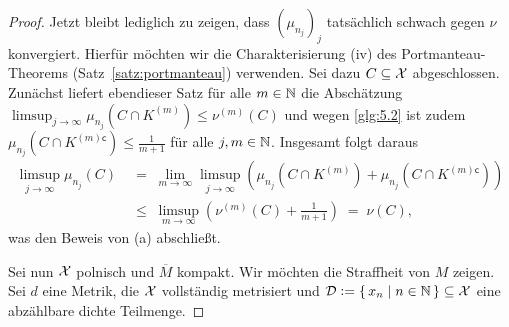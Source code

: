 \documentclass[../thesis/thesis.tex]{subfiles}
\begin{document}
\begin{proof}
		Jetzt bleibt lediglich zu zeigen, dass $(\mu_{n_j})_j$ tatsächlich schwach gegen $\nu$ konvergiert. 
		Hierfür möchten wir die Charakterisierung (iv) des Portmanteau-Theorems (Satz~\ref{satz:portmanteau}) verwenden.
		Sei dazu $C \subseteq \mathcal{X}$ abgeschlossen. Zunächst liefert ebendieser Satz für alle $m \in \mathbb{N}$ die 
		Abschätzung $\limsup_{j \to \infty} \mu_{n_j}(C \cap K^{(m)}) \leq \nu^{(m)}(C)$ und wegen \eqref{glg:5.2} ist 
		zudem $\mu_{n_j}(C \cap K^{(m) \mathsf{c}}) \leq  \frac{1}{m+1}$ für alle $j, m \in \mathbb{N}$. Insgesamt folgt daraus 
		\begin{align*}
			\limsup_{j \to \infty} \mu_{n_j}(C) \; &=    \; \lim_{m \to \infty} \limsup_{j \to \infty} 
			\left( \mu_{n_j}(C \cap K^{(m)}) + \mu_{n_j}(C \cap K^{(m) \mathsf{c}}) \right) \\
			&\leq \; \limsup_{m \to \infty} \left( \nu^{(m)}(C) + \frac{1}{m+1} \right) 
			\; = \; \nu(C) \text{,}
		\end{align*}
		was den Beweis von (a) abschließt.
		
		Sei nun $\mathcal{X}$ polnisch und $\overline{M}$ kompakt. Wir möchten die Straffheit von $M$ zeigen. Sei $d$ eine Metrik, die $\mathcal{X}$ vollständig metrisiert 
		und $\mathcal{D} \vcentcolon = \left\{\, x_n \; \middle| \; n \in \mathbb{N} \,\right\} \subseteq \mathcal{X}$ eine abzählbare dichte Teilmenge.
		

\end{proof}
\end{document}
